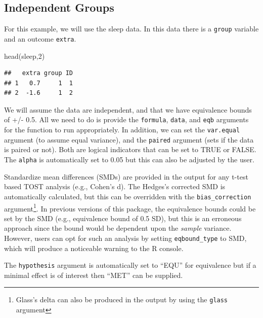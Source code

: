 \documentclass[]{interact}
\theoremstyle{plain}%
\theoremstyle{definition}
\theoremstyle{remark}
\newenvironment{Shaded}{\begin{snugshade}}{\end{snugshade}}
\newcommand{\DecValTok}[1]{\textcolor[rgb]{0.00,0.00,0.81}{#1}}
\newcommand{\FunctionTok}[1]{\textcolor[rgb]{0.00,0.00,0.00}{#1}}
\newcommand{\NormalTok}[1]{#1}
\begin{document}
\hypertarget{independent-groups}{%
\subsection{Independent Groups}\label{independent-groups}}

For this example, we will use the sleep data. In this data there is a
\texttt{group} variable and an outcome \texttt{extra}.

\begin{Shaded}
\begin{Highlighting}[]
\FunctionTok{head}\NormalTok{(sleep,}\DecValTok{2}\NormalTok{)}
\end{Highlighting}
\end{Shaded}

\begin{verbatim}
##   extra group ID
## 1   0.7     1  1
## 2  -1.6     1  2
\end{verbatim}

We will assume the data are independent, and that we have equivalence
bounds of +/- 0.5. All we need to do is provide the \texttt{formula},
\texttt{data}, and \texttt{eqb} arguments for the function to run
appropriately. In addition, we can set the \texttt{var.equal} argument
(to assume equal variance), and the \texttt{paired} argument (sets if
the data is paired or not). Both are logical indicators that can be set
to TRUE or FALSE. The \texttt{alpha} is automatically set to 0.05 but
this can also be adjusted by the user.

Standardize mean differences (SMDs) are provided in the output for any
t-test based TOST analysis (e.g., Cohen's d). The Hedges's corrected SMD
\citep{hedges_bias} is automatically calculated, but this can be
overridden with the \texttt{bias\_correction} argument\footnote{Glass's
  delta can also be produced in the output by using the \texttt{glass}
  argument}. In previous versions of this package, the equivalence
bounds could be set by the SMD (e.g., equivalence bound of 0.5 SD), but
this is an erroneous approach since the bound would be dependent upon
the \emph{sample} variance. However, users can opt for such an analysis
by setting \texttt{eqbound\_type} to SMD, which will produce a
noticeable warning to the R console.

The \texttt{hypothesis} argument is automatically set to ``EQU'' for
equivalence but if a minimal effect is of interest then ``MET'' can be
supplied.
\end{document}

